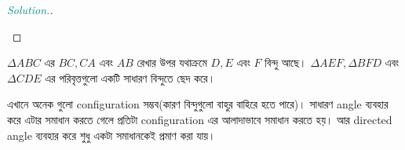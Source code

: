\documentclass[a4paper,11pt]{article}
\newenvironment{sltn}{\begin{proof}[\emph{\textcolor{darkcyan}{Solution.}}]} {\end{proof}}
\begin{document}
\begin{sltn}
\begin{center}
	\end{center}
\end{sltn}
\begin{thrm}
	$\Delta ABC$ এর $BC,CA$ এবং $AB$ রেখার উপর যথাক্রমে $D,E$ এবং $F$ বিন্দু আছে। $\Delta AEF, \Delta BFD$ এবং $\Delta CDE$ এর পরিবৃত্তগুলো একটি সাধারণ বিন্দুতে ছেদ করে। 
\end{thrm}
এখানে অনেক গুলো configuration সম্ভব(কারণ বিন্দুগুলো বাহুর বাহিরে হতে পারে)। সাধারণ angle ব্যবহার করে এটার সমাধান করতে গেলে প্রতিটা configuration এর আলাদাভাবে সমাধান করতে হয়। আর directed angle ব্যবহার করে শুধু একটা সমাধানকেই প্রমাণ করা যায়। 
\end{document}
